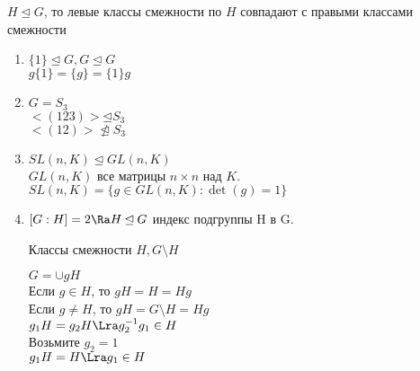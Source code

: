 \begin{conseq}
$H \unlhd G$, то левые классы смежности по $H$ совпадают с правыми классами смежности
\end{conseq}
\begin{exmp}\hfill
\begin{enumerate}
    \item $\{1\} \unlhd G, G \unlhd G$ \\
    $g\{1\} = \{g\} = \{1\}g$\\
    \item $G = S_3$\\
    $<(123)> \unlhd S_3$\\
    $<(12)> \ntrianglelefteq S_3$\\
    \item $SL(n, K) \unlhd GL(n, K)$\\
    $GL(n, K)$ все матрицы $n \times n$ над $K$.
    $SL(n, K) = \{g \in GL(n, K)\colon\det(g) = 1\}$
    \item 
    $[G:H] = 2 \Ra H \unlhd G$
    индекс подгруппы H в G.

    Классы смежности $H, G \setminus H$

    $G = \cup gH$\\
    Если $g \in H$, то $gH = H = Hg$\\
    Если $g \ne H$, то $gH = G\setminus H = Hg$\\

    $g_1H = g_2H \Lra g_2^{-1}g_1 \in H$ \\
    Возьмите $g_2 = 1$\\
    $g_1H = H \Lra g_1 \in H$\\
\end{enumerate}
\end{exmp}

